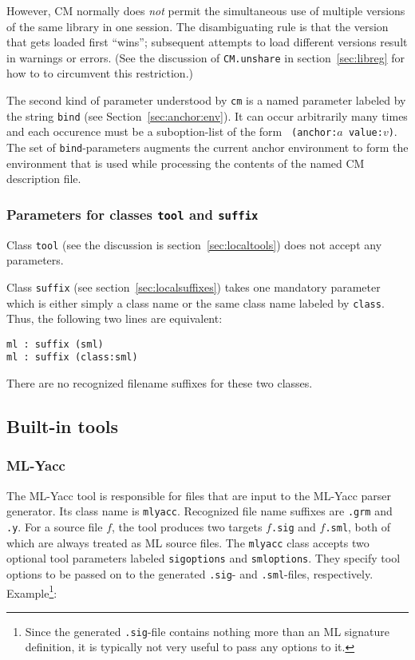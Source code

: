 \documentclass[titlepage,letterpaper]{article}
\begin{document}
However, CM normally does {\em not} permit the simultaneous use of
multiple versions of the same library in one session.  The
disambiguating rule is that the version that gets loaded first
``wins''; subsequent attempts to load different versions result in
warnings or errors.  (See the discussion of {\tt CM.unshare} in
section~\ref{sec:libreg} for how to to circumvent this restriction.)

The second kind of parameter understood by {\tt cm} is a named
parameter labeled by the string {\tt bind} (see
Section~\ref{sec:anchor:env}).  It can occur arbitrarily many times
and each occurence must be a suboption-list of the form {\tt
(anchor:$a$ value:$v$)}.  The set of {\tt bind}-parameters augments
the current anchor environment to form the environment that is used
while processing the contents of the named CM description file.

\subsubsection{Parameters for classes {\tt tool} and {\tt suffix}}

Class {\tt tool} (see the discussion is section~\ref{sec:localtools})
does not accept any parameters.

Class {\tt suffix} (see section~\ref{sec:localsuffixes}) takes one
mandatory parameter which is either simply a class name or the same
class name labeled by {\tt class}.  Thus, the following two lines are
equivalent:

\begin{verbatim}
ml : suffix (sml)
ml : suffix (class:sml)
\end{verbatim}

There are no recognized filename suffixes for these two classes.

\subsection{Built-in tools}
\label{sec:builtin-tools}

\subsubsection{ML-Yacc}

The ML-Yacc tool is responsible for files that are input to the
ML-Yacc parser generator.  Its class name is {\tt mlyacc}.  Recognized
file name suffixes are {\tt .grm} and {\tt .y}.  For a source file
$f$, the tool produces two targets $f${\tt .sig} and $f${\tt .sml},
both of which are always treated as ML source files.  The {\tt mlyacc}
class accepts two optional tool parameters labeled {\tt sigoptions}
and {\tt smloptions}.  They specify tool options to be passed on to
the generated {\tt .sig}- and {\tt .sml}-files, respectively.
Example\footnote{Since the generated {\tt .sig}-file contains nothing
more than an ML signature definition, it is typically not very useful
to pass any options to it.}:
\end{document}
